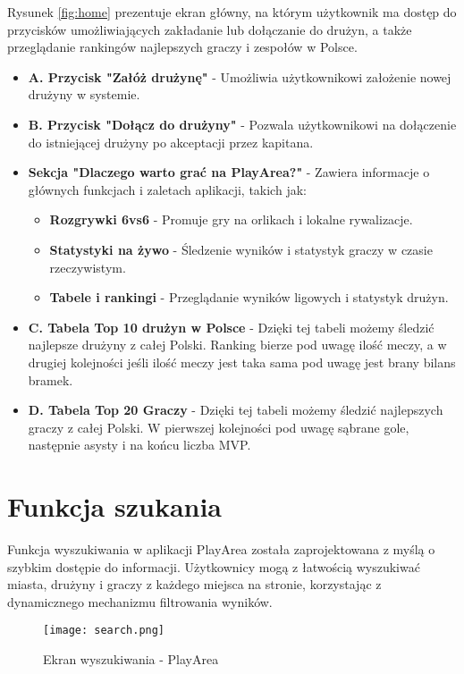 \documentclass[wmii,inf,inz]{uwmthesis} %
\begin{document}
\noindent
\noindent Rysunek \ref{fig:home} prezentuje ekran główny, na którym użytkownik ma dostęp do przycisków umożliwiających zakładanie lub dołączanie do drużyn, a także przeglądanie rankingów najlepszych graczy i zespołów w Polsce.
\begin{itemize}
    \item \textbf{A. Przycisk "Załóż drużynę"} - Umożliwia użytkownikowi założenie nowej drużyny w systemie.
    \item \textbf{B. Przycisk "Dołącz do drużyny"} - Pozwala użytkownikowi na dołączenie do istniejącej drużyny po akceptacji przez kapitana.
    \item \textbf{Sekcja "Dlaczego warto grać na PlayArea?"} - Zawiera informacje o głównych funkcjach i zaletach aplikacji, takich jak:
    \begin{itemize}[label=$\cdot$]
        \item \textbf{Rozgrywki 6vs6} - Promuje gry na orlikach i lokalne rywalizacje.
        \item \textbf{Statystyki na żywo} - Śledzenie wyników i statystyk graczy w czasie rzeczywistym.
        \item \textbf{Tabele i rankingi} - Przeglądanie wyników ligowych i statystyk drużyn.
    \end{itemize}
    \item \textbf{C. Tabela Top 10 drużyn w Polsce} - Dzięki tej tabeli możemy śledzić najlepsze drużyny z całej Polski. Ranking bierze pod uwagę ilość meczy, a w drugiej kolejności jeśli ilość meczy jest taka sama pod uwagę jest brany bilans bramek.
    \item \textbf{D. Tabela Top 20 Graczy} - Dzięki tej tabeli możemy śledzić najlepszych graczy z całej Polski. W pierwszej kolejności pod uwagę sąbrane gole, następnie asysty i na końcu liczba MVP.
\end{itemize}

\section{Funkcja szukania}
\noindent
Funkcja wyszukiwania w aplikacji PlayArea została zaprojektowana z myślą o szybkim dostępie do informacji. Użytkownicy mogą z łatwością wyszukiwać miasta, drużyny i graczy z każdego miejsca na stronie, korzystając z dynamicznego mechanizmu filtrowania wyników.\newline
\begin{figure}[H]
    \centering
    \texttt{[image: search.png]}
    \caption{Ekran wyszukiwania - PlayArea}
    \label{fig:search}
\end{figure}
\noindent
\newline
\end{document}

